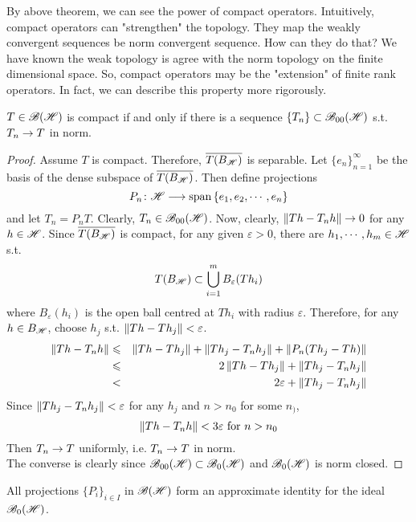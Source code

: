 By above theorem, we can see the power of compact operators. Intuitively, compact operators can "strengthen" the topology. They map the weakly convergent sequences be norm convergent sequence. How can they do that? We have known the weak topology is agree with the norm topology on the finite dimensional space. So, compact operators may be the "extension" of finite rank operators. In fact, we can describe this property more rigorously.

\begin{thm}
	$T \in \mathscr{B(H)}$ is compact if and only if there is a sequence $\{T_n\} \subset \mathscr{B}_{00}\mathscr{(H)}$ s.t. $T_n \rightarrow T$ in norm.
\end{thm}
\begin{proof}
	Assume $T$ is compact. Therefore, $\overline{T(B_{\mathscr{H}})}$ is separable. Let $\{e_n\}_{n=1}^{\infty}$ be the basis of the dense subspace of $\overline{T(B_{\mathscr{H}})}$. Then define projections
	\begin{equation*}
		P_n \colon \mathscr{H} \longrightarrow \operatorname{span}{\{e_1, e_2, \cdots, e_n\}}
	\end{equation*}
	and let $T_n = P_nT$. Clearly, $T_n \in \mathscr{B}_{00}\mathscr{(H)}$. Now, clearly, $\left\lVert Th - T_nh\right\lVert \rightarrow 0$ for any $h \in \mathscr{H}$. Since $\overline{T(B_{\mathscr{H}})}$ is compact, for any given $\varepsilon > 0$, there are $h_1, \cdots, h_m \in \mathscr{H}$ s.t.
	\begin{equation*}
		T(B_{\mathscr{H}}) \subset \bigcup_{i=1}^{m}B_{\varepsilon}(Th_i)
	\end{equation*}
	where $B_{\varepsilon}(h_i)$ is the open ball centred at $Th_i$ with radius $\varepsilon$. Therefore, for any $h \in B_{\mathscr{H}}$, choose $h_j$ s.t. $\left\lVert Th-Th_j\right\lVert < \varepsilon$.
	\begin{eqnarray*}
		\left\lVert Th-T_nh\right\lVert &\leqslant& \left\lVert Th - Th_j\right\lVert + \left\lVert Th_j - T_nh_j\right\lVert + \left\lVert P_n(Th_j-Th)\right\lVert \\
		&\leqslant& 2\left\lVert Th - Th_j\right\lVert +  \left\lVert Th_j - T_nh_j\right\lVert \\
		&<& 2\varepsilon +  \left\lVert Th_j - T_nh_j\right\lVert
	\end{eqnarray*}
	Since $\left\lVert Th_j - T_{n}h_j\right\lVert < \varepsilon$ for any $h_j$ and $n > n_0$ for some $n_)$,  
	\begin{equation*}
		\left\lVert Th-T_nh\right\lVert < 3\varepsilon \text{ for } n > n_0
	\end{equation*}
	Then $T_n \rightarrow T$ uniformly, i.e. $T_n \rightarrow T$ in norm. \\
	The converse is clearly since $\mathscr{B}_{00}\mathscr{(H)} \subset \mathscr{B}_{0}\mathscr{(H)}$ and $\mathscr{B}_{0}\mathscr{(H)}$ is norm closed.
\end{proof}
\begin{cor}
	All projections $\{P_i\}_{i \in I}$ in $\mathscr{B(H)}$ form an approximate identity for the ideal $\mathscr{B}_{0}\mathscr{(H)}$.
\end{cor}

